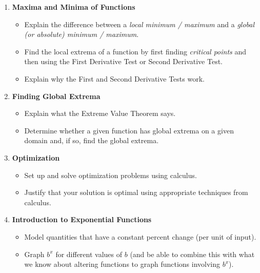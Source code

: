 \documentclass{article}
\begin{document}
\begin{enumerate}
\begin{itemize}
  \end{itemize}

\item \textbf{Maxima and Minima of Functions} %
  \begin{itemize}

  \item Explain the difference between a \emph{local minimum / maximum} and a \emph{global (or absolute) minimum / maximum}.

  \item Find the local extrema of a function by first finding \emph{critical points} and then using the First Derivative Test or Second Derivative Test.

  \item Explain why the First and Second Derivative Tests work.

  \end{itemize}

\item \textbf{Finding Global Extrema} %
  \begin{itemize}
  \item Explain what the Extreme Value Theorem says.

  \item Determine whether a given function has global extrema on a given domain and, if so, find the global extrema.

  \end{itemize}

\item \textbf{Optimization} %
  \begin{itemize}
  \item Set up and solve optimization problems using calculus.

  \item Justify that your solution is optimal using appropriate techniques from calculus.

  \end{itemize}

\item \textbf{Introduction to Exponential Functions} %
  \begin{itemize}
  \item Model quantities that have a constant percent change (per unit of input). 

  \item Graph $b^x$ for different values of $b$ (and be able to combine this with what we know about altering functions to graph functions involving $b^x$).


\end{itemize}
\end{enumerate}
\end{document}
